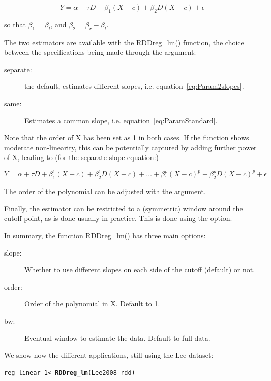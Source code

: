 \documentclass[english,nojss]{jss}\usepackage{graphicx, color}
\makeatletter
\newcommand{\hlfunctioncall}[1]{\textcolor[rgb]{0.501960784313725,0,0.329411764705882}{\textbf{#1}}}%
\newenvironment{kframe}{%
 \def\at@end@of@kframe{}%
 \ifinner\ifhmode%
  \def\at@end@of@kframe{\end{minipage}}%
  \begin{minipage}{\columnwidth}%
 \fi\fi%
 \def\FrameCommand##1{\hskip\@totalleftmargin \hskip-\fboxsep
 \colorbox{shadecolor}{##1}\hskip-\fboxsep
     \hskip-\linewidth \hskip-\@totalleftmargin \hskip\columnwidth}%
 \MakeFramed {\advance\hsize-\width
   \@totalleftmargin\z@ \linewidth\hsize
   \@setminipage}}%
 {\par\unskip\endMakeFramed%
 \at@end@of@kframe}
\newenvironment{knitrout}{}{} %
\makeatother
\begin{document}
\begin{equation}
Y=\alpha+\tau D+\beta_{1}(X-c)+\beta_{2}D(X-c)+\epsilon\label{eq:Param2slopes}
\end{equation}


so that $\beta_{1}=\beta_{l}$, and $\beta_{2}=\beta_{r}-\beta_{l}$. 

The two estimators are available with the RDDreg\_lm() function, the
choice between the specifications being made through the 
argument:
\begin{description}
\item [{separate:}] the default, estimates different slopes, i.e. equation~\ref{eq:Param2slopes}.
\item [{same:}] Estimates a common slope, i.e. equation~\ref{eq:ParamStandard}.
\end{description}
Note that the order of X has been set as 1 in both cases. If the function
shows moderate non-linearity, this can be potentially captured by
adding further power of X, leading to (for the separate slope equation:)

\begin{equation}
Y=\alpha+\tau D+\beta_{1}^{1}(X-c)+\beta_{2}^{1}D(X-c)+\ldots+\beta_{1}^{p}(X-c)^{p}+\beta_{2}^{p}D(X-c)^{p}+\epsilon\label{eq:ParamSlopesPowers}
\end{equation}


The order of the polynomial can be adjusted with the 
argument. 

Finally, the estimator can be restricted to a (symmetric) window around
the cutoff point, as is done usually in practice. This is done using
the  option. 

In summary, the function RDDreg\_lm() has three main options: 
\begin{description}
\item [{slope:}] Whether to use different slopes on each side of the cutoff
(default) or not.
\item [{order:}] Order of the polynomial in X. Default to 1.
\item [{bw:}] Eventual window to estimate the data. Default to full data. 
\end{description}
We show now the different applications, still using the Lee dataset:

\begin{knitrout}
\color{fgcolor}\begin{kframe}
\begin{alltt}
reg_linear_1 <- \hlfunctioncall{RDDreg_lm}(Lee2008_rdd)
\end{alltt}
\end{kframe}
\end{knitrout}
\end{document}
